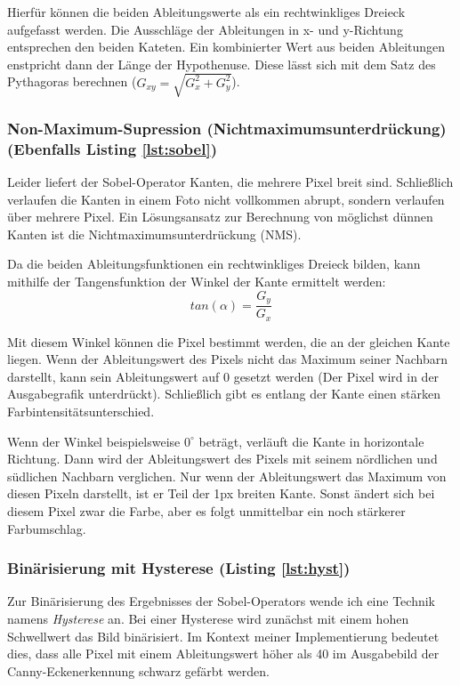 Hierfür können die beiden Ableitungswerte als ein rechtwinkliges Dreieck aufgefasst werden. Die Ausschläge der Ableitungen in x- und y-Richtung entsprechen den beiden Kateten. Ein kombinierter Wert aus beiden Ableitungen enstpricht dann der Länge der Hypothenuse. Diese lässt sich mit dem Satz des Pythagoras berechnen (\(G_{xy} = \sqrt{G_x^2 + G_y^2}\)).

\subsubsection{Non-Maximum-Supression (Nichtmaximumsunterdrückung) (Ebenfalls Listing \ref{lst:sobel})}
Leider liefert der Sobel-Operator Kanten, die mehrere Pixel breit sind. Schließlich verlaufen die Kanten in einem Foto nicht vollkommen abrupt, sondern verlaufen über mehrere Pixel. 
Ein Lösungsansatz zur Berechnung von möglichst dünnen Kanten ist die Nichtmaximumsunterdrückung (NMS). 

Da die beiden Ableitungsfunktionen ein rechtwinkliges Dreieck bilden, kann mithilfe der Tangensfunktion der Winkel der Kante ermittelt werden:
\begin{equation}
	tan(\alpha) = \frac{G_y}{G_x}
\end{equation}

Mit diesem Winkel können die Pixel bestimmt werden, die an der gleichen Kante liegen. Wenn der Ableitungswert des Pixels nicht das Maximum seiner Nachbarn darstellt, kann sein Ableitungswert auf 0 gesetzt werden (Der Pixel wird in der Ausgabegrafik unterdrückt). Schließlich gibt es entlang der Kante einen stärken Farbintensitätsunterschied.  

Wenn der Winkel beispielsweise \(0^{\circ}\) beträgt, verläuft die Kante in horizontale Richtung. Dann wird der Ableitungswert des Pixels mit seinem nördlichen und südlichen Nachbarn verglichen.
Nur wenn der Ableitungswert das Maximum von diesen Pixeln darstellt, ist er Teil der 1px breiten Kante. Sonst ändert sich bei diesem Pixel zwar die Farbe, aber es folgt unmittelbar ein noch stärkerer Farbumschlag.

\subsubsection{Binärisierung mit Hysterese (Listing \ref{lst:hyst})}
Zur Binärisierung des Ergebnisses der Sobel-Operators wende ich eine Technik namens \textit{Hysterese} an. Bei einer Hysterese wird zunächst mit einem hohen Schwellwert das Bild binärisiert. 
Im Kontext meiner Implementierung bedeutet dies, dass alle Pixel mit einem Ableitungswert höher als 40 im Ausgabebild der Canny-Eckenerkennung schwarz gefärbt werden.

